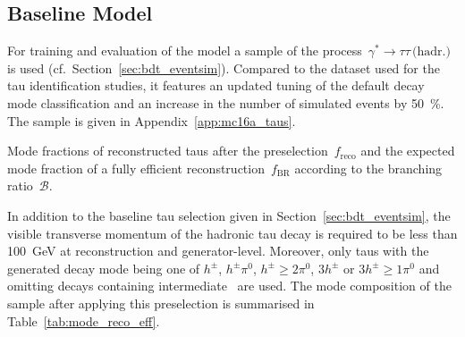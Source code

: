 \subsection{Baseline Model}
\label{sec:pfo_baseline}

For training and evaluation of the model a sample of the
process~$\gamma^* \rightarrow \tau \tau \, \text{(hadr.)}$ is used (cf.\
Section~\ref{sec:bdt_eventsim}). Compared to the dataset used for the
tau identification studies, it features an updated tuning of the default decay
mode classification and an increase in the number of simulated events by
\SI{50}{\percent}. The sample is given in Appendix~\ref{app:mc16a_taus}.

\begin{table}[htb]
  \centering
  {\small}
  \caption{Mode fractions of reconstructed taus after the
    preselection~$f_\text{reco}$ and the expected mode fraction of a fully
    efficient reconstruction~$f_\text{BR}$ according to the branching
    ratio~$\mathcal{B}$.}
  \label{tab:mode_reco_eff}
\end{table}

In addition to the baseline tau selection given in
Section~\ref{sec:bdt_eventsim}, the visible transverse momentum of the hadronic
tau decay is required to be less than \SI{100}{\giga\electronvolt} at
reconstruction and generator-level. Moreover, only taus with the generated decay
mode being one of $h^\pm$, $h^\pm \pi^0$, $h^\pm \geq 2\pi^0$, $3h^\pm$ or
$3h^\pm \geq 1\pi^0$ and omitting decays containing
intermediate~ are used. The mode composition of the sample
after applying this preselection is summarised in Table~\ref{tab:mode_reco_eff}.

